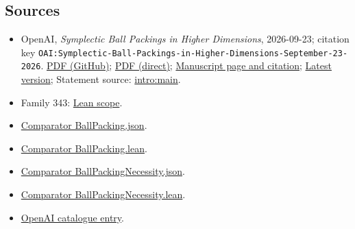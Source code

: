 \documentclass[11pt]{article}
\begin{document}
\subsection{Sources}
\begin{itemize}
\item OpenAI, \emph{Symplectic Ball Packings in Higher Dimensions}, 2026-09-23; citation key \texttt{OAI:Symplectic-Ball-Packings-in-Higher-Dimensions-September-23-2026}. \href{https://github.com/openai/math/blob/adc7f1241b42e322a6451854ab7e4b4c146bf78a/preprints/Symplectic-Ball-Packings-in-Higher-Dimensions-September-23-2026/paper.pdf}{PDF (GitHub)}; \href{https://github.com/openai/math/raw/adc7f1241b42e322a6451854ab7e4b4c146bf78a/preprints/Symplectic-Ball-Packings-in-Higher-Dimensions-September-23-2026/paper.pdf}{PDF (direct)}; \href{https://github.com/openai/math/blob/adc7f1241b42e322a6451854ab7e4b4c146bf78a/preprints/Symplectic-Ball-Packings-in-Higher-Dimensions-September-23-2026/README.md}{Manuscript page and citation}; \href{https://github.com/openai/math/blob/main/preprints/Symplectic-Ball-Packings-in-Higher-Dimensions-September-23-2026/paper.pdf}{Latest version}; Statement source: \href{https://github.com/openai/math/blob/adc7f1241b42e322a6451854ab7e4b4c146bf78a/preprints/Symplectic-Ball-Packings-in-Higher-Dimensions-September-23-2026/build/sections/introduction.tex\#L18}{intro:main}.
\item Family 343: \href{https://github.com/openai/math/blob/adc7f1241b42e322a6451854ab7e4b4c146bf78a/lean/docs/343.md}{Lean scope}.
\item \href{https://github.com/openai/math/blob/adc7f1241b42e322a6451854ab7e4b4c146bf78a/lean/ComparatorChallenges/BallPacking.json}{Comparator BallPacking.json}.
\item \href{https://github.com/openai/math/blob/adc7f1241b42e322a6451854ab7e4b4c146bf78a/lean/ComparatorChallenges/BallPacking.lean}{Comparator BallPacking.lean}.
\item \href{https://github.com/openai/math/blob/adc7f1241b42e322a6451854ab7e4b4c146bf78a/lean/ComparatorChallenges/BallPackingNecessity.json}{Comparator BallPackingNecessity.json}.
\item \href{https://github.com/openai/math/blob/adc7f1241b42e322a6451854ab7e4b4c146bf78a/lean/ComparatorChallenges/BallPackingNecessity.lean}{Comparator BallPackingNecessity.lean}.
\item \href{https://github.com/openai/math/blob/adc7f1241b42e322a6451854ab7e4b4c146bf78a/CONTENTS.md}{OpenAI catalogue entry}.
\end{itemize}
\end{document}
